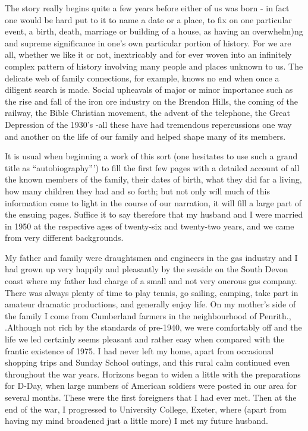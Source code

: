 
The story really begins quite a few years before either of us was born - in fact one would be hard put to it to name a date or a place, to fix on one particular event, a birth, death, marriage or building of a house, as having an overwhelm)ng and supreme significance in one's own particular portion of history. For we are all, whether we like it or not, inextricably and for ever woven into an infinitely complex pattern of history involving many people and places unknown to us. The delicate web of family connections, for example, knows no end when once a diligent search is made. Social upheavals of major or minor importance such as the rise and fall of the iron ore industry on the Brendon Hills, the coming of the railway, the Bible Christian movement, the advent of the telephone, the Great Depression of the 1930's -all these have had tremendous repercussions one way and another on the life of our family and helped shape many of its members.

It is usual when beginning a work of this sort (one hesitates to use such a grand title as “autobiography”') to fill the first few pages with a detailed account of all the known members of the family, their dates of birth, what they did far a living, how many children they had and so forth; but not only will much of this information come to light in the course of our narration, it will fill a large part of the ensuing pages. Suffice it to say therefore that my husband and I were married in 1950 at the respective ages of twenty-six and twenty-two years, and we came from very different backgrounds.

My father and family were draughtsmen and engineers in the gas industry and I had grown up very happily and pleasantly by the seaside on the South Devon coast where my father had charge of a small and not very onerous gas company. There was always plenty of time to play tennis, go sailing, camping, take part in amateur dramatic productions, and generally enjoy life. On my mother's side of the family I come from Cumberland farmers in the neighbourhood of Penrith., .Although not rich by the standards of pre-1940, we were comfortably off and the life we led certainly seems pleasant and rather easy when compared with the frantic existence of 1975. I had never left my home, apart from occasional shopping trips and Sunday School outings, and this rural calm continued even throughout the war years. Horizons began to widen a little with the preparations for D-Day, when large numbers of American soldiers were posted in our area for several months. These were the first foreigners that I had ever met.  Then at the end of the war, I progressed to University College, Exeter, where (apart from having my mind broadened just a little more) I met my future husband.

